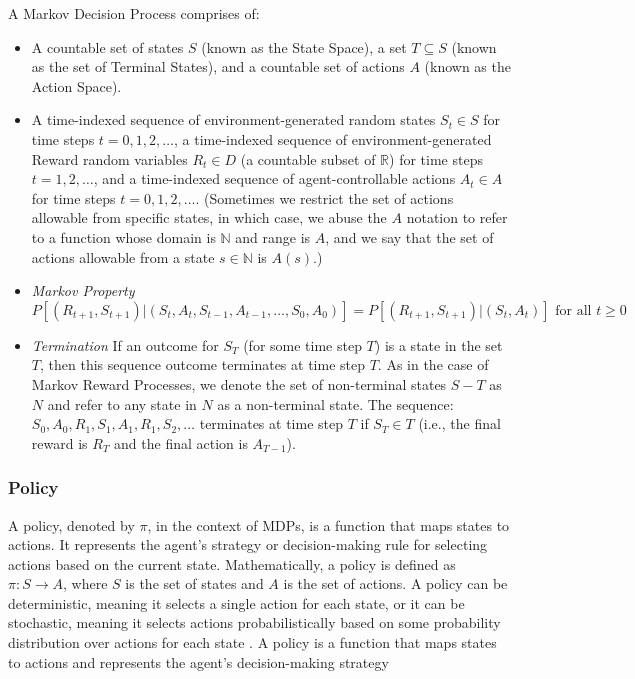\documentclass[../xlapes02]{subfiles}
\begin{document}
    \begin{definition}
        A Markov Decision Process comprises of:
        \begin{itemize}
            \item A countable set of states $S$ (known as the State Space), a set $T \subseteq S$ (known as the set of Terminal States), and a countable set of actions $A$ (known as the Action Space).
            \item A time-indexed sequence of environment-generated random states $S_t \in S$ for time steps $t = 0, 1, 2, \ldots$, a time-indexed sequence of environment-generated Reward random variables $R_t \in D$ (a countable subset of $\mathbb{R}$) for time steps $t = 1, 2, \ldots$, and a time-indexed sequence of agent-controllable actions $A_t \in A$ for time steps $t = 0, 1, 2, \ldots$. (Sometimes we restrict the set of actions allowable from specific states, in which case, we abuse the $A$ notation to refer to a function whose domain is $\mathbb{N}$ and range is $A$, and we say that the set of actions allowable from a state $s \in \mathbb{N}$ is $A(s)$.)
            \item \emph{Markov Property}
            \[
                P[(R_{t+1}, S_{t+1})|(S_t, A_t, S_{t-1}, A_{t-1}, \ldots , S_0, A_0)] = P[(R_{t+1}, S_{t+1})|(S_t, A_t)] \text{ for all } t \geq 0
            \]
            \item \emph{Termination} If an outcome for $S_T$ (for some time step $T$) is a state in the set $T$, then this sequence outcome terminates at time step $T$. As in the case of Markov Reward Processes, we denote the set of non-terminal states $S - T$ as $N$ and refer to any state in $N$ as a non-terminal state. The sequence: $S_0, A_0, R_1, S_1, A_1, R_1, S_2, \ldots$ terminates at time step $T$ if $S_T \in T$ (i.e., the final reward is $R_T$ and the final action is $A_{T-1}$).
        \end{itemize}
    \end{definition}

    \subsubsection{Policy}\label{subsubsec:policy}
    A policy, denoted by $\pi$, in the context of MDPs, is a function that maps states to actions.
    It represents the agent's strategy or decision-making rule for selecting actions based on the current state.
    Mathematically, a policy is defined as $\pi: S \rightarrow A$, where $S$ is the set of states and $A$ is the set of actions.
    A policy can be deterministic, meaning it selects a single action for each state, or it can be stochastic, meaning it selects actions probabilistically based on some probability distribution over actions for each state \cite{GPT3.5}.
    A policy is a function that maps states to actions and represents the agent's decision-making strategy
\end{document}
